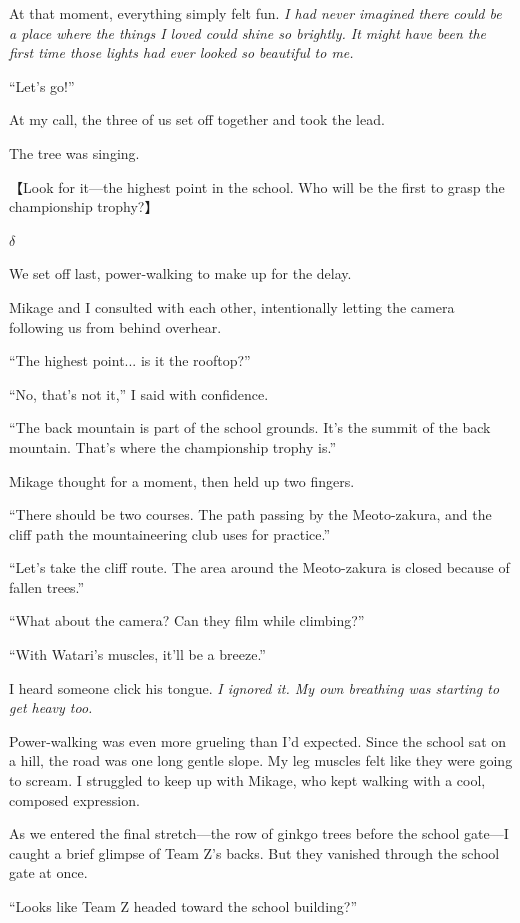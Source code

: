 \documentclass[
    a4paper,
    12pt,
    twoside,
    openany,
    UTF8,
    fontset=windows
]{ctexbook}
\begin{document}
At that moment, everything simply felt fun. \textit{I had never imagined there could be a place where the things I loved could shine so brightly. It might have been the first time those lights had ever looked so beautiful to me.}

``Let's go!''

At my call, the three of us set off together and took the lead.

The tree was singing.

【Look for it---the highest point in the school. Who will be the first to grasp the championship trophy?】

$\delta$

We set off last, power-walking to make up for the delay.

Mikage and I consulted with each other, intentionally letting the camera following us from behind overhear.

``The highest point... is it the rooftop?''

``No, that's not it,'' I said with confidence.

``The back mountain is part of the school grounds. It's the summit of the back mountain. That's where the championship trophy is.''

Mikage thought for a moment, then held up two fingers.

``There should be two courses. The path passing by the Meoto-zakura, and the cliff path the mountaineering club uses for practice.''

``Let's take the cliff route. The area around the Meoto-zakura is closed because of fallen trees.''

``What about the camera? Can they film while climbing?''

``With Watari's muscles, it'll be a breeze.''

I heard someone click his tongue. \textit{I ignored it. My own breathing was starting to get heavy too.}

Power-walking was even more grueling than I'd expected. Since the school sat on a hill, the road was one long gentle slope. My leg muscles felt like they were going to scream. I struggled to keep up with Mikage, who kept walking with a cool, composed expression.

As we entered the final stretch---the row of ginkgo trees before the school gate---I caught a brief glimpse of Team Z's backs. But they vanished through the school gate at once.

``Looks like Team Z headed toward the school building?''
\end{document}

